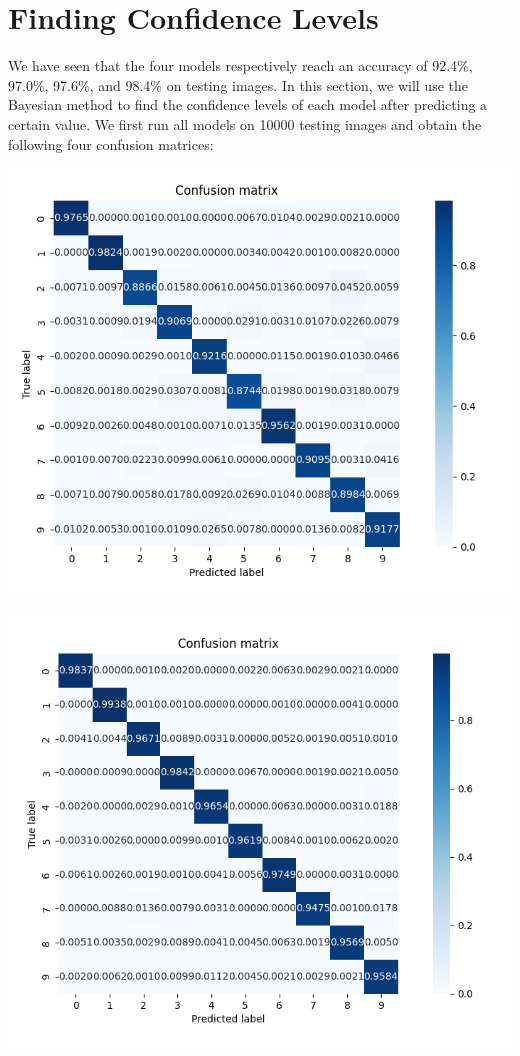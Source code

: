 \documentclass{article}
\begin{document}
\section{Finding Confidence Levels}

We have seen that the four models respectively reach an accuracy of 92.4\%, 97.0\%, 97.6\%, and 98.4\% on testing images. In this section, we will use the Bayesian method to find the confidence levels of each model after predicting a certain value.
We first run all models on 10000 testing images and obtain the following four confusion matrices:

\hspace{-0.3in}
\begin{minipage}{0.5\linewidth}
\includegraphics[width = \linewidth]{Confusion_matrix1.png}
\end{minipage}
\begin{minipage}{0.5\linewidth}
\includegraphics[width = \linewidth]{Confusion_matrix2.png}
\end{minipage}
\end{document}
